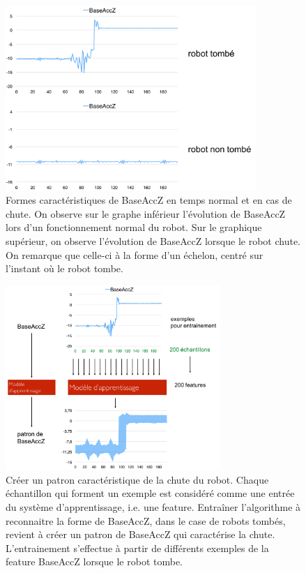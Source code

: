 \begin{figure}[H]
	\centering\includegraphics[height=7cm]{images/fall_not_fall.png}
	\caption[Formes caractéristiques de BaseAccZ en temps normal et en cas de chute]{Formes caractéristiques de BaseAccZ en temps normal et en cas de chute. On observe sur le graphe inférieur l'évolution de BaseAccZ lors d'un fonctionnement normal du robot. Sur le graphique supérieur, on observe l'évolution de BaseAccZ lorsque le robot chute. On remarque que celle-ci à la forme d'un échelon, centré sur l'instant où le robot tombe.}
	\label{fig:Formes caractéristiques de BaseAccZ en temps normal et en cas de chute}
\end{figure}

\begin{figure}[H]
	\centering\includegraphics[height=7cm]{images/patron.png}
	\caption[Créer un patron caractéristique de la chute du robot]{Créer un patron caractéristique de la chute du robot. Chaque échantillon qui forment un exemple est considéré comme une entrée du système d'apprentissage, i.e. une feature. Entraîner l'algorithme à reconnaitre la forme de BaseAccZ, dans le case de robots tombés, revient à créer un patron de BaseAccZ qui caractérise la chute. L'entrainement s'effectue à partir de différents exemples de la feature BaseAccZ lorsque le robot tombe.}
	\label{fig:Créer un patron caractéristique de la chute du robot}
\end{figure}

